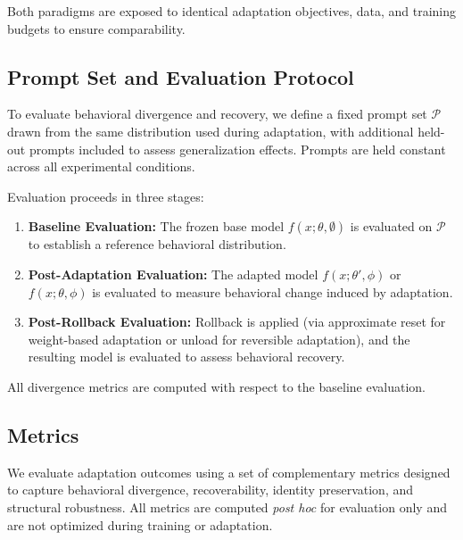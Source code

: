 \documentclass[10pt]{article}
\begin{document}
	Both paradigms are exposed to identical adaptation objectives, data, and training budgets to ensure comparability.
	
	
	\subsection{Prompt Set and Evaluation Protocol}
	\label{sec:ps_ep}
	
	To evaluate behavioral divergence and recovery, we define a fixed prompt set $\mathcal{P}$ drawn from the same distribution used during adaptation, with additional held-out prompts included to assess generalization effects. Prompts are held constant across all experimental conditions.
	
	Evaluation proceeds in three stages:
	\begin{enumerate}
		\item \textbf{Baseline Evaluation:} The frozen base model $f(x;\theta,\emptyset)$ is evaluated on $\mathcal{P}$ to establish a reference behavioral distribution.
		\item \textbf{Post-Adaptation Evaluation:} The adapted model $f(x;\theta',\phi)$ or $f(x;\theta,\phi)$ is evaluated to measure behavioral change induced by adaptation.
		\item \textbf{Post-Rollback Evaluation:} Rollback is applied (via approximate reset for weight-based adaptation or unload for reversible adaptation), and the resulting model is evaluated to assess behavioral recovery.
	\end{enumerate}
	
	All divergence metrics are computed with respect to the baseline evaluation.
	
	\subsection{Metrics}
	\label{sec:metrics}
	
	We evaluate adaptation outcomes using a set of complementary metrics designed to capture behavioral divergence, recoverability, identity preservation, and structural robustness. All metrics are computed \emph{post hoc} for evaluation only and are not optimized during training or adaptation.
	
\end{document}
